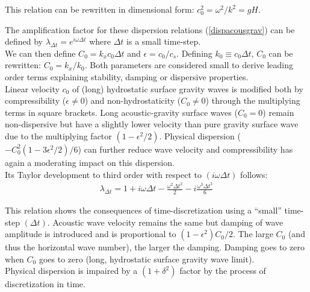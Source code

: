 \documentclass[a4paper]{article}
\numberwithin{equation}{section}
\begin{document}
  This relation can be rewritten in dimensional form: $c_0^2 = {\omega^2}/{k^2}= gH$.
  
  The amplification factor for these dispersion relations (\ref{dispacousgrav}) can be defined by $\lambda_{\Delta t}=e^{i\omega\Delta t}$ where $\Delta t$ is a small time-step.\\

  We can then define $C_0=k_x c_0\Delta t$ and $\epsilon={c_0}/{c_s}$. Defining $ k_0\equiv c_0 \Delta t$, $C_0$ can be rewritten: $C_0=k_x/k_0$.
  Both parameters are considered small to derive leading order terms explaining stability, damping or dispersive properties.\\
    
    
  Linear velocity $c_0$ of (long) hydrostatic surface gravity waves is modified both by compressibility ($\epsilon\ne0$) and non-hydrostaticity ($C_0\ne0$) through the multiplying terms in square brackets. Long acoustic-gravity surface waves ($C_0=0$) remain non-dispersive but have a slightly lower velocity than pure gravity surface wave due to the multiplying factor $(1-\epsilon^2/2)$. Physical dispersion ($-C_0^2(1-3\epsilon^2/2)/6$) can further reduce wave velocity and compressibility has again a moderating impact on this dispersion.\\

  Its Taylor development to third order with respect to $(i\omega\Delta t)$ follows:
  \begin{equation}
   \label{lambdadt}
    \begin{split}
      \displaystyle
      \lambda_{\Delta t}=1+i\omega\Delta{t}-\frac{\omega^2\Delta{t}^2}{2}-i\frac{\omega^3\Delta{t}^3}{6}
    \end{split}
    \end{equation}
\label{lambda_ana}

This relation shows the consequences of time-discretization using a ``small'' time-step $(\Delta t)$. Acoustic wave velocity remains the same but damping of wave amplitude is introduced and is proportional to $(1-\epsilon^2)C_0/2$. The large $C_0$ (and thus the horizontal wave number), the larger the damping. Damping goes to zero when $C_0$ goes to zero (long, hydrostatic surface gravity wave limit).\\
Physical dispersion is impaired by a $(1+\delta^2)$ factor by the process of discretization in time.\\
\end{document}
